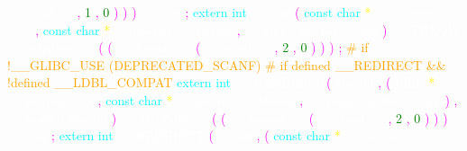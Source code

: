 \textcolor{white}{\_\_scanf\_\_} 
\textcolor{magenta}{,} 
\textcolor{green}{1} 
\textcolor{magenta}{,} 
\textcolor{green}{0} 
\textcolor{magenta}{)} 
\textcolor{magenta}{)} 
\textcolor{magenta}{)} 
\textcolor{white}{\_\_wur} 
\textcolor{magenta}{;} 
\textcolor{cyan}{extern} 
\textcolor{cyan}{int} 
\textcolor{white}{vsscanf} 
\textcolor{magenta}{(} 
\textcolor{cyan}{const} 
\textcolor{cyan}{char} 
\textcolor{yellow}{*} 
\textcolor{white}{\_\_restrict} 
\textcolor{white}{\_\_s} 
\textcolor{magenta}{,} 
\textcolor{cyan}{const} 
\textcolor{cyan}{char} 
\textcolor{yellow}{*} 
\textcolor{white}{\_\_restrict} 
\textcolor{white}{\_\_format} 
\textcolor{magenta}{,} 
\textcolor{white}{\_\_gnuc\_va\_list} 
\textcolor{white}{\_\_arg} 
\textcolor{magenta}{)} 
\textcolor{white}{\_\_THROW} 
\textcolor{white}{\_\_attribute\_\_} 
\textcolor{magenta}{(} 
\textcolor{magenta}{(} 
\textcolor{white}{\_\_format\_\_} 
\textcolor{magenta}{(} 
\textcolor{white}{\_\_scanf\_\_} 
\textcolor{magenta}{,} 
\textcolor{green}{2} 
\textcolor{magenta}{,} 
\textcolor{green}{0} 
\textcolor{magenta}{)} 
\textcolor{magenta}{)} 
\textcolor{magenta}{)} 
\textcolor{magenta}{;} 
\textcolor{orange}{\# if !\_\_GLIBC\_USE (DEPRECATED\_SCANF)} 
\textcolor{orange}{\# if defined \_\_REDIRECT \&\& !defined \_\_LDBL\_COMPAT} 
\textcolor{cyan}{extern} 
\textcolor{cyan}{int} 
\textcolor{white}{\_\_REDIRECT} 
\textcolor{magenta}{(} 
\textcolor{white}{vfscanf} 
\textcolor{magenta}{,} 
\textcolor{magenta}{(} 
\textcolor{white}{FILE} 
\textcolor{yellow}{*} 
\textcolor{white}{\_\_restrict} 
\textcolor{white}{\_\_s} 
\textcolor{magenta}{,} 
\textcolor{cyan}{const} 
\textcolor{cyan}{char} 
\textcolor{yellow}{*} 
\textcolor{white}{\_\_restrict} 
\textcolor{white}{\_\_format} 
\textcolor{magenta}{,} 
\textcolor{white}{\_\_gnuc\_va\_list} 
\textcolor{white}{\_\_arg} 
\textcolor{magenta}{)} 
\textcolor{magenta}{,} 
\textcolor{white}{\_\_isoc99\_vfscanf} 
\textcolor{magenta}{)} 
\textcolor{white}{\_\_attribute\_\_} 
\textcolor{magenta}{(} 
\textcolor{magenta}{(} 
\textcolor{white}{\_\_format\_\_} 
\textcolor{magenta}{(} 
\textcolor{white}{\_\_scanf\_\_} 
\textcolor{magenta}{,} 
\textcolor{green}{2} 
\textcolor{magenta}{,} 
\textcolor{green}{0} 
\textcolor{magenta}{)} 
\textcolor{magenta}{)} 
\textcolor{magenta}{)} 
\textcolor{white}{\_\_wur} 
\textcolor{magenta}{;} 
\textcolor{cyan}{extern} 
\textcolor{cyan}{int} 
\textcolor{white}{\_\_REDIRECT} 
\textcolor{magenta}{(} 
\textcolor{white}{vscanf} 
\textcolor{magenta}{,} 
\textcolor{magenta}{(} 
\textcolor{cyan}{const} 
\textcolor{cyan}{char} 
\textcolor{yellow}{*} 
\textcolor{white}{\_\_restrict} 
